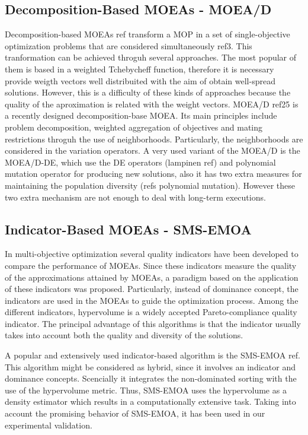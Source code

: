 \subsection{Decomposition-Based MOEAs - MOEA/D}

Decomposition-based MOEAs ref transform a MOP in a set of single-objective optimization problems that are considered simultaneously ref3.
%
This tranformation can be achieved throguh several approaches.
%
The most popular of them is based in a weighted Tchebycheff function, therefore it is necessary provide weigth vectors well distribuited with the aim of obtain well-spread solutions.
%
However, this is a difficulty of these kinds of approaches because the quality of the aproximation is related with the weight vectors.
%
MOEA/D ref25 is a recently designed decomposition-base MOEA.
%
Its main principles include problem decomposition, weighted aggregation of objectives and mating restrictions throguh the use of neighborhoods.
%
Particularly, the neighborhoods are considered in the variation operators.
%
A very used variant of the MOEA/D is the MOEA/D-DE, which use the DE operators (lampinen ref) and polynomial mutation operator for producing new solutions, also it has two extra measures for maintaining the population diversity (refs polynomial mutation).
%
However these two extra mechanism are not enough to deal with long-term executions.


\subsection{Indicator-Based MOEAs - SMS-EMOA}

In multi-objective optimization several quality indicators have been developed to compare the performance of MOEAs.
%
Since these indicators measure the quality of the approximations attained by MOEAs, a paradigm based on the application of these indicators was proposed.
%
Particularly, instead of dominance concept, the indicators are used in the MOEAs to guide the optimization process.
%
Among the different indicators, hypervolume is a widely accepted Pareto-compliance quality indicator.
%
The principal advantage of this algorithms is that the indicator usually takes into account both the quality and diversity of the solutions.
%

A popular and extensively used indicator-based algorithm is the SMS-EMOA ref.
%
This algorithm might be considered as hybrid, since it involves an indicator and dominance concepts.
%
Scencially it integrates the non-dominated sorting with the use of the hypervolume metric.
%
Thus, SMS-EMOA uses the hypervolume as a density estimator which results in a computationally extensive task.
%
Taking into account the promising behavior of SMS-EMOA, it has been used in our experimental validation.
%


